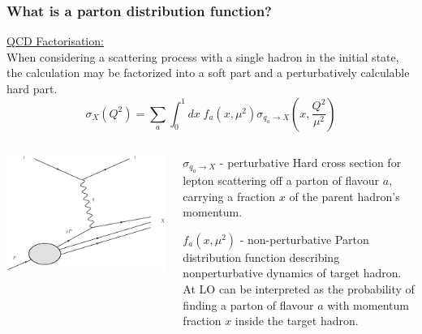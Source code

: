 \documentclass[10pt]{beamer}
\newcommand{\be}{\begin{equation*}}
\newcommand{\ee}{\end{equation*}}
\begin{document}
\begin{frame}
\frametitle{What is a parton distribution function?}
\small \underline{QCD Factorisation:} \\
When considering a scattering process with a single hadron in the initial state, the calculation may be factorized into a soft part and a perturbatively calculable hard part.
\be \sigma_X(Q^2)= \sum_{a} \int_0^1 dx\; f_a(x,\mu^2)\sigma_{q_a \to X} \left( x,\frac{Q^2}{\mu^2} \right) \ee

\begin{columns}
\begin{column}{0.5\textwidth}
\includegraphics[width=\textwidth]{DIS.eps}
\end{column}

	\begin{column}{0.5\textwidth}
	\begin{block}{\small $\sigma_{q_a \to X} $ - perturbative}
	\footnotesize Hard cross section for lepton scattering off a parton of flavour $a$, carrying a fraction $x$ of the parent hadron's momentum.
	\end{block}
	
	\begin{block}{\small $f_a(x,\mu^2) $ - non-perturbative}
		\footnotesize Parton distribution function describing nonperturbative dynamics of target hadron. At LO can be interpreted as the probability of finding a parton of flavour
		$a$ with momentum fraction $x$ inside the target hadron.
	\end{block}

	\end{column}
\end{columns}
\end{frame}
\end{document}
